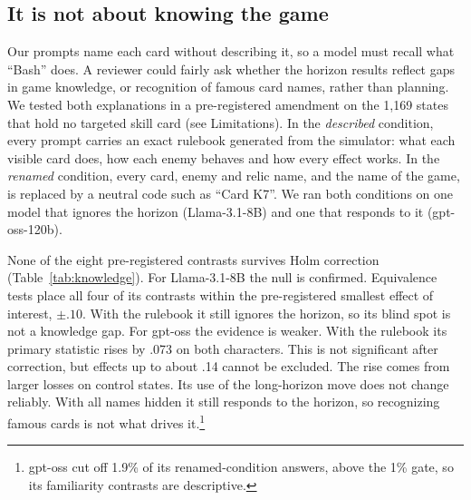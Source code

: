 \subsection{It is not about knowing the game}

Our prompts name each card without describing it, so a model must recall what ``Bash'' does. A reviewer could fairly ask whether the horizon results reflect gaps in game knowledge, or recognition of famous card names, rather than planning. We tested both explanations in a pre-registered amendment on the 1,169 states that hold no targeted skill card (see Limitations). In the \emph{described} condition, every prompt carries an exact rulebook generated from the simulator: what each visible card does, how each enemy behaves and how every effect works. In the \emph{renamed} condition, every card, enemy and relic name, and the name of the game, is replaced by a neutral code such as ``Card K7''. We ran both conditions on one model that ignores the horizon (Llama-3.1-8B) and one that responds to it (gpt-oss-120b).

None of the eight pre-registered contrasts survives Holm correction \citep{holm1979} (Table~\ref{tab:knowledge}). For Llama-3.1-8B the null is confirmed. Equivalence tests \citep{schuirmann1987tost} place all four of its contrasts within the pre-registered smallest effect of interest, $\pm.10$. With the rulebook it still ignores the horizon, so its blind spot is not a knowledge gap. For gpt-oss the evidence is weaker. With the rulebook its primary statistic rises by .073 on both characters. This is not significant after correction, but effects up to about .14 cannot be excluded. The rise comes from larger losses on control states. Its use of the long-horizon move does not change reliably. With all names hidden it still responds to the horizon, so recognizing famous cards is not what drives it.\footnote{gpt-oss cut off 1.9\% of its renamed-condition answers, above the 1\% gate, so its familiarity contrasts are descriptive.}

